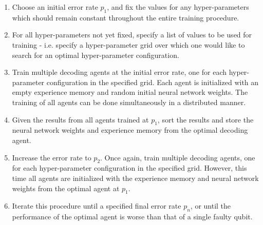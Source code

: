 \documentclass[twocolumn,preprintnumbers,amsmath,amssymb,notitlepage,nofootinbib,longbibliography,superscriptaddress,aps,pra,10pt]{revtex4-1}
\begin{document}
	\begin{enumerate}
		\item Choose an initial error rate $p_1$, and fix the values for any hyper-parameters which should remain constant throughout the entire training procedure.
		\item For all hyper-parameters not yet fixed, specify a list of values to be used for training - i.e. specify a hyper-parameter grid over which one would like to search for an optimal hyper-parameter configuration.
		\item Train multiple decoding agents at the initial error rate, one for each hyper-parameter configuration in the specified grid.
		Each agent is initialized with an empty experience memory and random initial neural network weights.
		The training of all agents can be done simultaneously in a distributed manner.
		\item Given the results from all agents trained at $p_1$, sort the results and store the neural network weights and experience memory from the optimal decoding agent.
		\item Increase the error rate to $p_2$.
		Once again, train multiple decoding agents, one for each hyper-parameter configuration in the specified grid.
		However, this time all agents are initialized with the experience memory and neural network weights from the optimal agent at $p_1$.
		\item Iterate this procedure until a specified final error rate $p_n$, or until the performance of the optimal agent is worse than that of a single faulty qubit.
	\end{enumerate}
\end{document}
